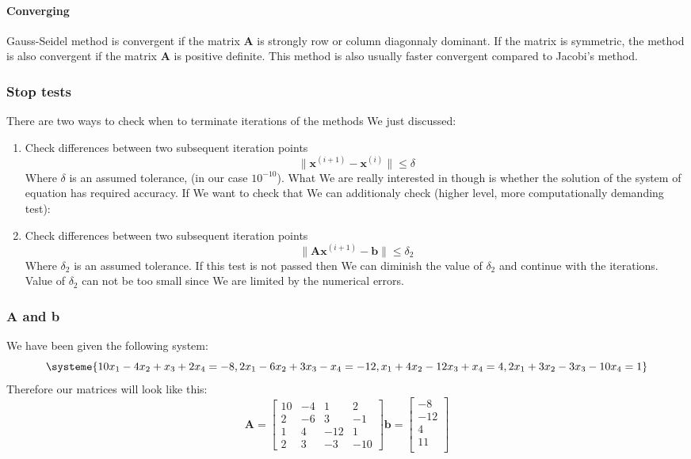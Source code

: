 \documentclass[12pt]{report}
\begin{document}
\paragraph{Converging}
Gauss-Seidel method is convergent if the matrix \textbf{A} is strongly row or column diagonnaly dominant. If the matrix is symmetric, the method is also convergent if the matrix \textbf{A} is positive definite. This method is also usually faster convergent compared to Jacobi's method.

\subsubsection{Stop tests}
There are two ways to check when to terminate iterations of the methods We just discussed:
\begin{enumerate}
\item Check differences between two subsequent iteration points
\[
\| \mathbf{x}^{(i+1)} - \mathbf{x}^{(i)} \| \leq \delta
\]
Where $\delta$ is an assumed tolerance, (in our case $10^{-10}$). What We are really interested in though is whether the solution of the system of equation has required accuracy. If We want to check that We can additionaly check (higher level, more computationally demanding test):
\item Check differences between two subsequent iteration points
\[
\| \mathbf{A}\mathbf{x}^{(i+1)} - \mathbf{b}\| \leq \delta_2
\]
Where $\delta_2$ is an assumed tolerance. If this test is not passed then We can diminish the value of $\delta_2$ and continue with the iterations. Value of $\delta_2$ can not be too small since We are limited by the numerical errors.
\end{enumerate}

\subsubsection{\textbf{A} and \textbf{b}}
We have been given the following system:
\[
\systeme{10x_1-4x_2+x_3+2x_4=-8, 2x_1-6x_2+3x_3-x_4=-12, x_1+4x_2-12x_3+x_4=4, 2x_1+3x_2-3x_3-10x_4=1}
\]
Therefore our matrices will look like this:
\[
\textbf{A} = \begin{bmatrix}
10 & -4 & 1 & 2 \\
2 & -6 & 3 & -1 \\
1 & 4 & -12 & 1 \\
2 & 3 & -3 & -10
\end{bmatrix}
\textbf{b} = \begin{bmatrix}
-8 \\
-12 \\
4 \\
11 \\
\end{bmatrix}
\]
\end{document}
